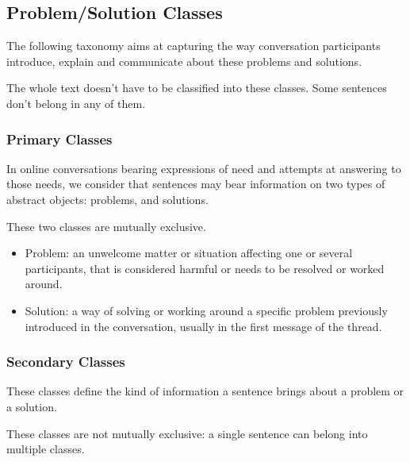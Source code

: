 \documentclass[11pt]{article}
\begin{document}
\begin{itemize}
\subsection{Problem/Solution Classes}

The following taxonomy aims at capturing the way conversation participants introduce, explain and communicate about these problems and solutions.

The whole text doesn't have to be classified into these classes. Some sentences don't belong in any of them. 

\subsubsection{Primary Classes}

In online conversations bearing expressions of need and attempts at answering to those needs, we consider that sentences may bear information on two types of abstract objects: problems, and solutions.

These two classes are mutually exclusive.

\begin{itemize}
	\item Problem: an unwelcome matter or situation affecting one or several participants, that is considered harmful or needs to be resolved or worked around.
	\item Solution: a way of solving or working around a specific problem previously introduced in the conversation, usually in the first message of the thread.
\end{itemize}

\subsubsection{Secondary Classes}

These classes define the kind of information a sentence brings about a problem or a solution.

These classes are not mutually exclusive: a single sentence can belong into multiple classes.


\end{itemize}
\end{document}
